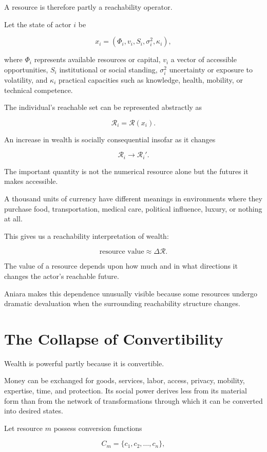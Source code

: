 \documentclass[11pt,oneside]{book}
\theoremstyle{definition}
\theoremstyle{remark}
\newcommand{\R}{\mathcal{R}}
\begin{document}
A resource is therefore partly a reachability operator.

Let the state of actor \(i\) be

\[
x_i
=
(\Phi_i,v_i,S_i,\sigma_i^2,\kappa_i),
\]

where \(\Phi_i\) represents available resources or capital, \(v_i\) a vector of accessible opportunities, \(S_i\) institutional or social standing, \(\sigma_i^2\) uncertainty or exposure to volatility, and \(\kappa_i\) practical capacities such as knowledge, health, mobility, or technical competence.

The individual's reachable set can be represented abstractly as

\[
\R_i
=
\R(x_i).
\]

An increase in wealth is socially consequential insofar as it changes

\[
\R_i
\rightarrow
\R_i'.
\]

The important quantity is not the numerical resource alone but the futures it makes accessible.

A thousand units of currency have different meanings in environments where they purchase food, transportation, medical care, political influence, luxury, or nothing at all.

This gives us a reachability interpretation of wealth:

\[
\text{resource value}
\approx
\Delta\R.
\]

The value of a resource depends upon how much and in what directions it changes the actor's reachable future.

Aniara makes this dependence unusually visible because some resources undergo dramatic devaluation when the surrounding reachability structure changes.

\section{The Collapse of Convertibility}

Wealth is powerful partly because it is convertible.

Money can be exchanged for goods, services, labor, access, privacy, mobility, expertise, time, and protection. Its social power derives less from its material form than from the network of transformations through which it can be converted into desired states.

Let resource \(m\) possess conversion functions

\[
C_m
=
\{
c_1,c_2,\ldots,c_n
\},
\]
\end{document}
